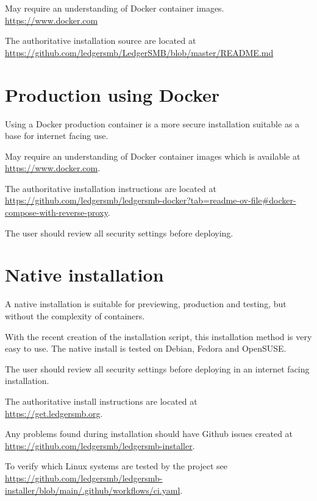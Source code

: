 May require an understanding of Docker container images. \\
\url{https://www.docker.com}

The authoritative installation source are located at \\ 
\url{https://github.com/ledgersmb/LedgerSMB/blob/master/README.md}

\section{Production using Docker}
\label{sec-installation-docker-production}

Using a Docker production container is a more secure installation suitable as a base for internet facing use.

May require an understanding of Docker container images which is available at \\
\url{https://www.docker.com}.

The authoritative installation instructions are located at \\
\url{https://github.com/ledgersmb/ledgersmb-docker?tab=readme-ov-file#docker-compose-with-reverse-proxy}.

The user should review all security settings before deploying.

\section{Native installation}
\label{sec-installation-native}

A native installation is suitable for previewing, production and testing, but without the complexity of containers.

With the recent creation of the installation script, this installation method is very easy to use.
The native install is tested on Debian, Fedora and OpenSUSE. 

The user should review all security settings before deploying in an internet facing installation.

The authoritative install instructions are located at \\
\url{https://get.ledgersmb.org}.

Any problems found during installation should have Github issues created at \\
\url{https://github.com/ledgersmb/ledgersmb-installer}. 

To verify which Linux systems are tested by the project see \\
\url{https://github.com/ledgersmb/ledgersmb-installer/blob/main/.github/workflows/ci.yaml}.

